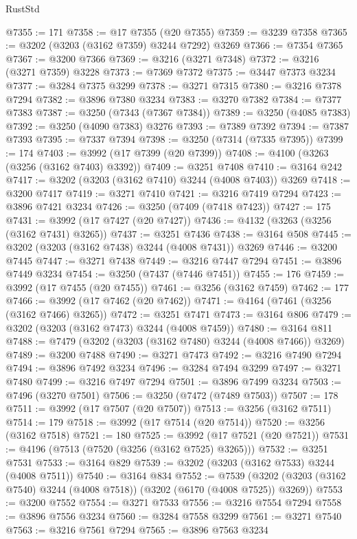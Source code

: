 \begin{lexlean}{RustStd}
\begin{coremodule}
@7355 := 171
@7358 := @17 @7355 (@20 @7355)
@7359 := @3239 @7358
@7365 := @3202 (@3203 (@3162 @7359) @3244 @7292) @3269
@7366 := @7354 @7365
@7367 := @3200 @7366
@7369 := @3216 (@3271 @7348)
@7372 := @3216 (@3271 @7359) @3228
@7373 := @7369 @7372
@7375 := @3447 @7373 @3234
@7377 := @3284 @7375 @3299
@7378 := @3271 @7315
@7380 := @3216 @7378 @7294
@7382 := @3896 @7380 @3234
@7383 := @3270 @7382
@7384 := @7377 @7383
@7387 := @3250 (@7343 (@7367 @7384))
@7389 := @3250 (@4085 @7383)
@7392 := @3250 (@4090 @7383) @3276
@7393 := @7389 @7392
@7394 := @7387 @7393
@7395 := @7337 @7394
@7398 := @3250 (@7314 (@7335 @7395))
@7399 := 174
@7403 := @3992 (@17 @7399 (@20 @7399))
@7408 := @4100 (@3263 (@3256 (@3162 @7403) @3392))
@7409 := @3251 @7408
@7410 := @3164 @242
@7417 := @3202 (@3203 (@3162 @7410) @3244 (@4008 @7403)) @3269
@7418 := @3200 @7417
@7419 := @3271 @7410
@7421 := @3216 @7419 @7294
@7423 := @3896 @7421 @3234
@7426 := @3250 (@7409 (@7418 @7423))
@7427 := 175
@7431 := @3992 (@17 @7427 (@20 @7427))
@7436 := @4132 (@3263 (@3256 (@3162 @7431) @3265))
@7437 := @3251 @7436
@7438 := @3164 @508
@7445 := @3202 (@3203 (@3162 @7438) @3244 (@4008 @7431)) @3269
@7446 := @3200 @7445
@7447 := @3271 @7438
@7449 := @3216 @7447 @7294
@7451 := @3896 @7449 @3234
@7454 := @3250 (@7437 (@7446 @7451))
@7455 := 176
@7459 := @3992 (@17 @7455 (@20 @7455))
@7461 := @3256 (@3162 @7459)
@7462 := 177
@7466 := @3992 (@17 @7462 (@20 @7462))
@7471 := @4164 (@7461 (@3256 (@3162 @7466) @3265))
@7472 := @3251 @7471
@7473 := @3164 @806
@7479 := @3202 (@3203 (@3162 @7473) @3244 (@4008 @7459))
@7480 := @3164 @811
@7488 := @7479 (@3202 (@3203 (@3162 @7480) @3244 (@4008 @7466)) @3269)
@7489 := @3200 @7488
@7490 := @3271 @7473
@7492 := @3216 @7490 @7294
@7494 := @3896 @7492 @3234
@7496 := @3284 @7494 @3299
@7497 := @3271 @7480
@7499 := @3216 @7497 @7294
@7501 := @3896 @7499 @3234
@7503 := @7496 (@3270 @7501)
@7506 := @3250 (@7472 (@7489 @7503))
@7507 := 178
@7511 := @3992 (@17 @7507 (@20 @7507))
@7513 := @3256 (@3162 @7511)
@7514 := 179
@7518 := @3992 (@17 @7514 (@20 @7514))
@7520 := @3256 (@3162 @7518)
@7521 := 180
@7525 := @3992 (@17 @7521 (@20 @7521))
@7531 := @4196 (@7513 (@7520 (@3256 (@3162 @7525) @3265)))
@7532 := @3251 @7531
@7533 := @3164 @829
@7539 := @3202 (@3203 (@3162 @7533) @3244 (@4008 @7511))
@7540 := @3164 @834
@7552 := @7539 (@3202 (@3203 (@3162 @7540) @3244 (@4008 @7518)) (@3202 (@6170 (@4008 @7525)) @3269))
@7553 := @3200 @7552
@7554 := @3271 @7533
@7556 := @3216 @7554 @7294
@7558 := @3896 @7556 @3234
@7560 := @3284 @7558 @3299
@7561 := @3271 @7540
@7563 := @3216 @7561 @7294
@7565 := @3896 @7563 @3234

\end{coremodule}
\end{lexlean}
